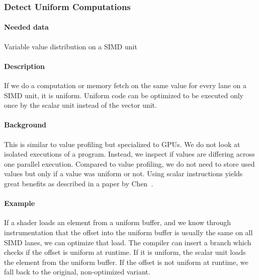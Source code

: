\subsubsection{Detect Uniform Computations}
\paragraph{Needed data} Variable value distribution on a SIMD unit
\paragraph{Description} If we do a computation or memory fetch on the same value for every lane on a SIMD unit, it is uniform. Uniform code can be optimized to be executed only once by the scalar unit instead of the vector unit.
\paragraph{Background} This is similar to value profiling but specialized to GPUs. We do not look at isolated executions of a program. Instead, we inspect if values are differing across one parallel execution. Compared to value profiling, we do not need to store used values but only if a value was uniform or not. Using scalar instructions yields great benefits as described in a paper by Chen~\cite{Chen2016}.
\paragraph{Example} If a shader loads an element from a uniform buffer, and we know through instrumentation that the offset into the uniform buffer is usually the same on all SIMD lanes, we can optimize that load.
The compiler can insert a branch which checks if the offset is uniform at runtime. If it is uniform, the scalar unit loads the element from the uniform buffer.
If the offset is not uniform at runtime, we fall back to the original, non-optimized variant.

